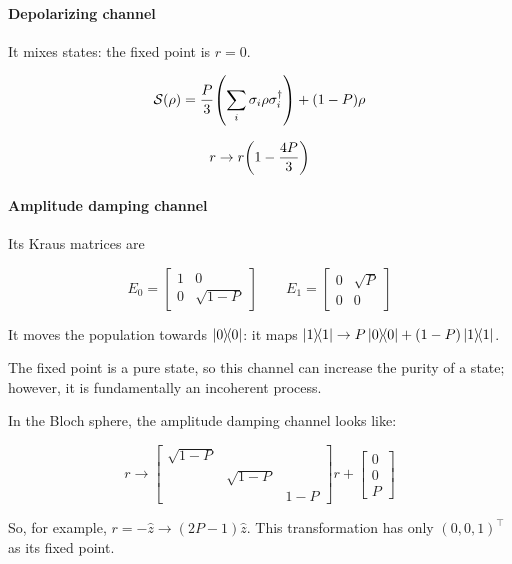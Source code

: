 \documentclass[main.tex]{subfiles}
\begin{document}
\paragraph{Depolarizing channel}

It mixes states: the fixed point is \(r = 0\).

\begin{equation}
    \mathcal S(\rho) = \frac{P}{3}\qty(\sum _i \sigma_i \rho \sigma_i ^\dag ) +
    \qty(1-P) \rho
\end{equation}

\begin{equation}
    r \rightarrow r \qty(1 - \frac{4P}{3})
\end{equation}

\paragraph{Amplitude damping channel}

Its Kraus matrices are

\begin{equation}
    E_0 = \begin{bmatrix}
    1   & 0 \\
    0   & \sqrt{1- P}
\end{bmatrix}
    \qquad
    E_1 = \begin{bmatrix}
    0   & \sqrt{P}  \\
     0  & 0
 \end{bmatrix}
\end{equation}

It moves the population towards \(\dyad{0} \):  it maps \(\dyad{1}  \rightarrow P \dyad{0} + (1-P) \dyad{1}  \).

The fixed point is a pure state, so this channel can increase the purity of a state; however,  it is fundamentally an incoherent process.

\begin{bluebox}
  In the Bloch sphere, the amplitude damping channel looks like:

  \begin{equation}
      r \rightarrow \begin{bmatrix}
      \sqrt{1-P}    &   &  \\
         &  \sqrt{1-P}  &  \\
         &   & 1-P
     \end{bmatrix}
      r + \begin{bmatrix}
      0 \\
      0  \\
      P
  \end{bmatrix}
  \end{equation}

  So, for example,  \(r = - \hat{z} \rightarrow (2P-1) \hat{z} \).
  This transformation has only \((0,0,1)^\top\) as its fixed point.
\end{bluebox}
\end{document}
